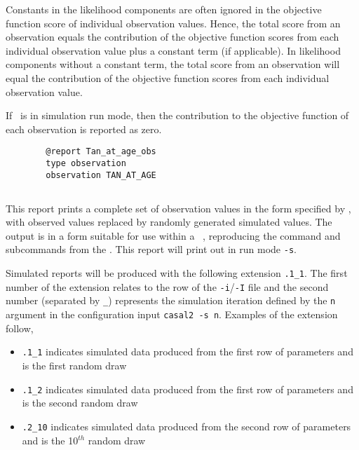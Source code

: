 Constants in the likelihood components are often ignored in the objective function score of individual observation values. Hence, the total score from an observation equals the contribution of the objective function scores from each individual observation value plus a constant term (if applicable). In likelihood components without a constant term, the total score from an observation will equal the contribution of the objective function scores from each individual observation value.

If \CNAME\ is in simulation run mode, then the contribution to the objective function of each observation is reported as zero.

\begin{verbatim}
		@report Tan_at_age_obs
		type observation
		observation TAN_AT_AGE
\end{verbatim}

\subsection{}\label{sec:Report-SimulatedObservation}

This report prints a complete set of observation values in the form specified by , with observed values replaced by randomly generated simulated values. The output is in a form  suitable for use within a \CNAME\ \config, reproducing the command and subcommands from the \config. This report will print out in run mode \texttt{-s}.


Simulated reports will be produced with the following extension \texttt{.1\_1}. The first number of the extension relates to the row of the \texttt{-i}/\texttt{-I} file and the second number (separated by \texttt{\_}) represents the simulation iteration defined by the \texttt{n} argument in the configuration input \texttt{casal2 -s n}. Examples of the extension follow,
\begin{itemize}
	\item \texttt{.1\_1} indicates simulated data produced from the first row of parameters and is the first random draw
	\item \texttt{.1\_2} indicates simulated data produced from the first row of parameters and is the second random draw
	\item \texttt{.2\_10} indicates simulated data produced from the second row of parameters and is the 10\(^{th}\) random draw
\end{itemize}
